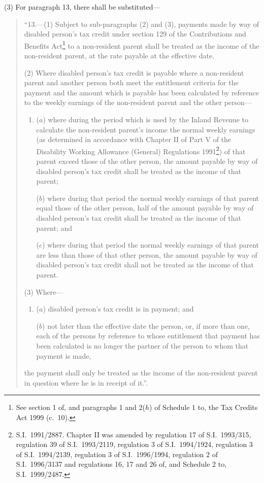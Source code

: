 \documentclass[12pt,a4paper]{article}
\begin{document}
(3) For paragraph 13, there shall be substituted—
\begin{quotation}
“13.---(1)  Subject to sub-paragraphs (2) and (3), payments made by way of disabled person’s tax credit under section 129 of the Contributions and Benefits Act\footnote{See section 1 of, and paragraphs 1 and 2($h$) of Schedule 1 to, the Tax Credits Act 1999 (c.\ 10).} to a non-resident parent shall be treated as the income of the non-resident parent, at the rate payable at the effective date.

(2) Where disabled person’s tax credit is payable where a non-resident parent and another person both meet the entitlement criteria for the payment and the amount which is payable has been calculated by reference to the weekly earnings of the non-resident parent and the other person—
\begin{enumerate}\item[]
($a$) where during the period which is used by the Inland Revenue to calculate the non-resident parent’s income the normal weekly earnings (as determined in accordance with Chapter II of Part V of the Disability Working Allowance (General) Regulations 1991\footnote{S.I.\ 1991/2887. Chapter II was amended by regulation 17 of S.I.\ 1993/315, regulation 39 of S.I.\ 1993/2119, regulation 3 of S.I.\ 1994/1924, regulation 3 of S.I.\ 1994/2139, regulation 3 of S.I.\ 1996/1994, regulation 2 of S.I.\ 1996/3137 and regulations 16, 17 and 26 of, and Schedule 2 to, S.I.\ 1999/2487.}) of that parent exceed those of the other person, the amount payable by way of disabled person’s tax credit shall be treated as the income of that parent;

($b$) where during that period the normal weekly earnings of that parent equal those of the other person, half of the amount payable by way of disabled person’s tax credit shall be treated as the income of that parent; and

($c$) where during that period the normal weekly earnings of that parent are less than those of that other person, the amount payable by way of disabled person’s tax credit shall not be treated as the income of that parent.
\end{enumerate}

(3) Where—
\begin{enumerate}\item[]
($a$) disabled person’s tax credit is in payment; and

($b$) not later than the effective date the person, or, if more than one, each of the persons by reference to whose entitlement that payment has been calculated is no longer the partner of the person to whom that payment is made,
\end{enumerate}
the payment shall only be treated as the income of the non-resident parent in question where he is in receipt of it.”.
\end{quotation}
\end{document}
